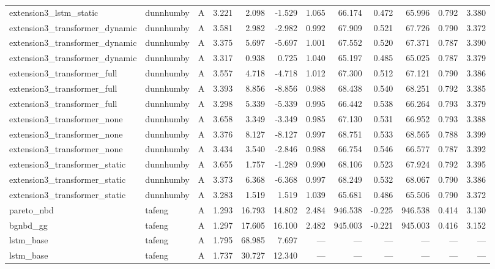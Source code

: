 \begin{table}
\begin{tabular}{lllrrrrrrrrr}
extension3_lstm_static & dunnhumby & A & 3.221 & 2.098 & -1.529 & 1.065 & 66.174 & 0.472 & 65.996 & 0.792 & 3.380 \\
extension3_transformer_dynamic & dunnhumby & A & 3.581 & 2.982 & -2.982 & 0.992 & 67.909 & 0.521 & 67.726 & 0.790 & 3.372 \\
extension3_transformer_dynamic & dunnhumby & A & 3.375 & 5.697 & -5.697 & 1.001 & 67.552 & 0.520 & 67.371 & 0.787 & 3.390 \\
extension3_transformer_dynamic & dunnhumby & A & 3.317 & 0.938 & 0.725 & 1.040 & 65.197 & 0.485 & 65.025 & 0.787 & 3.379 \\
extension3_transformer_full & dunnhumby & A & 3.557 & 4.718 & -4.718 & 1.012 & 67.300 & 0.512 & 67.121 & 0.790 & 3.386 \\
extension3_transformer_full & dunnhumby & A & 3.393 & 8.856 & -8.856 & 0.988 & 68.438 & 0.540 & 68.251 & 0.792 & 3.385 \\
extension3_transformer_full & dunnhumby & A & 3.298 & 5.339 & -5.339 & 0.995 & 66.442 & 0.538 & 66.264 & 0.793 & 3.379 \\
extension3_transformer_none & dunnhumby & A & 3.658 & 3.349 & -3.349 & 0.985 & 67.130 & 0.531 & 66.952 & 0.793 & 3.388 \\
extension3_transformer_none & dunnhumby & A & 3.376 & 8.127 & -8.127 & 0.997 & 68.751 & 0.533 & 68.565 & 0.788 & 3.399 \\
extension3_transformer_none & dunnhumby & A & 3.434 & 3.540 & -2.846 & 0.988 & 66.754 & 0.546 & 66.577 & 0.787 & 3.392 \\
extension3_transformer_static & dunnhumby & A & 3.655 & 1.757 & -1.289 & 0.990 & 68.106 & 0.523 & 67.924 & 0.792 & 3.395 \\
extension3_transformer_static & dunnhumby & A & 3.373 & 6.368 & -6.368 & 0.997 & 68.249 & 0.532 & 68.067 & 0.790 & 3.386 \\
extension3_transformer_static & dunnhumby & A & 3.283 & 1.519 & 1.519 & 1.039 & 65.681 & 0.486 & 65.506 & 0.790 & 3.372 \\
pareto_nbd & tafeng & A & 1.293 & 16.793 & 14.802 & 2.484 & 946.538 & -0.225 & 946.538 & 0.414 & 3.130 \\
bgnbd_gg & tafeng & A & 1.297 & 17.605 & 16.100 & 2.482 & 945.003 & -0.221 & 945.003 & 0.416 & 3.152 \\
lstm_base & tafeng & A & 1.795 & 68.985 & 7.697 & — & — & — & — & — & — \\
lstm_base & tafeng & A & 1.737 & 30.727 & 12.340 & — & — & — & — & — & — \\

\end{tabular}
\end{table}
